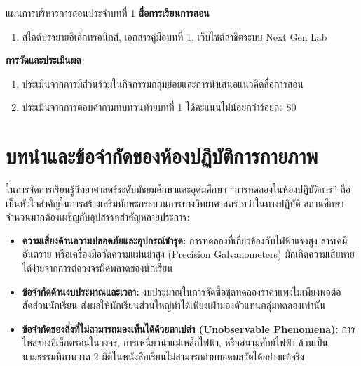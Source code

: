 \begin{teachingplan}{แผนการบริหารการสอนประจำบทที่ 1}
\noindent\textbf{สื่อการเรียนการสอน}
\begin{enumerate}[leftmargin=1.5em, itemsep=2pt]
    \item สไลด์บรรยายอิเล็กทรอนิกส์, เอกสารคู่มือบทที่ 1, เว็บไซต์สาธิตระบบ Next Gen Lab
\end{enumerate}

\noindent\textbf{การวัดและประเมินผล}
\begin{enumerate}[leftmargin=1.5em, itemsep=2pt]
    \item ประเมินจากการมีส่วนร่วมในกิจกรรมกลุ่มย่อยและการนำเสนอแนวคิดสื่อการสอน
    \item ประเมินจากการตอบคำถามทบทวนท้ายบทที่ 1 ได้คะแนนไม่น้อยกว่าร้อยละ 80
\end{enumerate}
\end{teachingplan}

\newpage

\section{บทนำและข้อจำกัดของห้องปฏิบัติการกายภาพ}
ในการจัดการเรียนรู้วิทยาศาสตร์ระดับมัธยมศึกษาและอุดมศึกษา “การทดลองในห้องปฏิบัติการ” ถือเป็นหัวใจสำคัญในการสร้างเสริมทักษะกระบวนการทางวิทยาศาสตร์ ทว่าในทางปฏิบัติ สถานศึกษาจำนวนมากต้องเผชิญกับอุปสรรคสำคัญหลายประการ:
\begin{itemize}[leftmargin=1.5em, itemsep=3pt]
    \item \textbf{ความเสี่ยงด้านความปลอดภัยและอุปกรณ์ชำรุด:} การทดลองที่เกี่ยวข้องกับไฟฟ้าแรงสูง สารเคมีอันตราย หรือเครื่องมือวัดความแม่นยำสูง (Precision Galvanometers) มักเกิดความเสียหายได้ง่ายจากการต่อวงจรผิดพลาดของนักเรียน
    \item \textbf{ข้อจำกัดด้านงบประมาณและเวลา:} งบประมาณในการจัดซื้อชุดทดลองราคาแพงไม่เพียงพอต่อสัดส่วนนักเรียน ส่งผลให้นักเรียนส่วนใหญ่ทำได้เพียงเฝ้ามองตัวแทนกลุ่มทดลองเท่านั้น
    \item \textbf{ข้อจำกัดของสิ่งที่ไม่สามารถมองเห็นได้ด้วยตาเปล่า (Unobservable Phenomena):} การไหลของอิเล็กตรอนในวงจร, การเหนี่ยวนำแม่เหล็กไฟฟ้า, หรือสนามศักย์ไฟฟ้า ล้วนเป็นนามธรรมที่ภาพวาด 2 มิติในหนังสือเรียนไม่สามารถถ่ายทอดพลวัตได้อย่างแท้จริง
\end{itemize}

